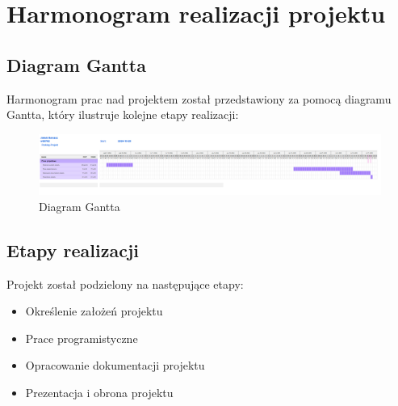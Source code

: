 \chapter{Harmonogram realizacji projektu}
\section{Diagram Gantta}
Harmonogram prac nad projektem został przedstawiony za pomocą diagramu Gantta, który ilustruje kolejne etapy realizacji:
\begin{figure}[ht]
    \centering
    \includegraphics[width=1\linewidth]{figures/Diagram_gantta.png}
    \caption{Diagram Gantta}
\end{figure}

\section{Etapy realizacji}
Projekt został podzielony na następujące etapy:
\begin{itemize}
    \item Określenie założeń projektu
    \item Prace programistyczne
    \item Opracowanie dokumentacji projektu
    \item Prezentacja i obrona projektu
\end{itemize}